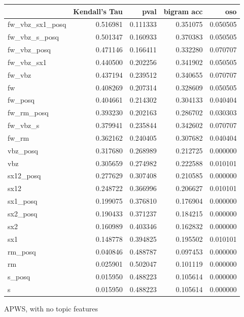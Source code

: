 \documentclass[11pt]{article}
\begin{document}
\begin{figure*}[h]
\begin{tabular}{lrrrr}
\toprule
{} &  Kendall's Tau &      pval &  bigram acc &       oso \\
\midrule
fw\_vbz\_sx1\_posq &       0.516981 &  0.111333 &    0.351075 &  0.050505 \\
fw\_vbz\_s\_posq   &       0.501347 &  0.160933 &    0.370383 &  0.050505 \\
fw\_vbz\_posq     &       0.471146 &  0.166411 &    0.332280 &  0.070707 \\
fw\_vbz\_sx1      &       0.440500 &  0.202256 &    0.341902 &  0.050505 \\
fw\_vbz          &       0.437194 &  0.239512 &    0.340655 &  0.070707 \\
fw              &       0.408269 &  0.207314 &    0.328609 &  0.050505 \\
fw\_posq         &       0.404661 &  0.214302 &    0.304133 &  0.040404 \\
fw\_rm\_posq      &       0.393230 &  0.202163 &    0.286702 &  0.030303 \\
fw\_vbz\_s        &       0.379941 &  0.235844 &    0.342602 &  0.070707 \\
fw\_rm           &       0.362162 &  0.240405 &    0.307682 &  0.040404 \\
vbz\_posq        &       0.317680 &  0.268989 &    0.212725 &  0.000000 \\
vbz             &       0.305659 &  0.274982 &    0.222588 &  0.010101 \\
sx12\_posq       &       0.277629 &  0.307408 &    0.210585 &  0.000000 \\
sx12            &       0.248722 &  0.366996 &    0.206627 &  0.010101 \\
sx1\_posq        &       0.199075 &  0.376810 &    0.176904 &  0.000000 \\
sx2\_posq        &       0.190433 &  0.371237 &    0.184215 &  0.000000 \\
sx2             &       0.160989 &  0.403346 &    0.162832 &  0.000000 \\
sx1             &       0.148778 &  0.394825 &    0.195502 &  0.010101 \\
rm\_posq         &       0.040846 &  0.488787 &    0.097453 &  0.000000 \\
rm              &       0.025901 &  0.502047 &    0.101119 &  0.000000 \\
s\_posq          &       0.015950 &  0.488223 &    0.105614 &  0.000000 \\
s               &       0.015950 &  0.488223 &    0.105614 &  0.000000 \\
\bottomrule
\end{tabular}
\caption{APWS, with no topic features}
\end{figure*}
\end{document}
